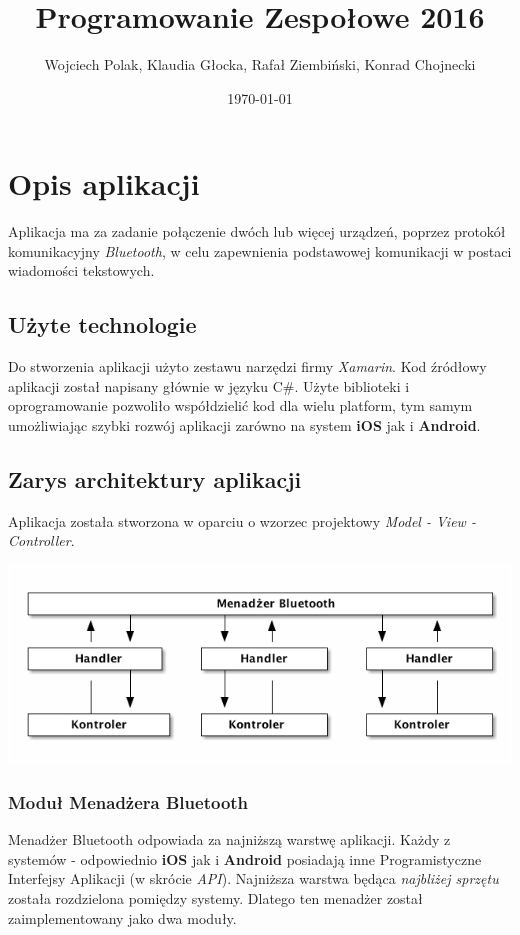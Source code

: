 \documentclass[a4paper, titlepage]{article}
\author{Wojciech Polak, Klaudia Głocka, Rafał Ziembiński, Konrad Chojnecki}
\date{\today}
\title{Programowanie Zespołowe 2016}
\begin{document}
\maketitle
\tableofcontents

\clearpage
\section{Opis aplikacji}
\label{sec-1}
Aplikacja ma za zadanie połączenie dwóch lub więcej urządzeń, poprzez protokół komunikacyjny \emph{Bluetooth}, w celu zapewnienia podstawowej komunikacji w postaci wiadomości tekstowych.
\subsection{Użyte technologie}
\label{sec-1-1}
Do stworzenia aplikacji użyto zestawu narzędzi firmy \emph{Xamarin}. Kod źródłowy aplikacji został napisany głównie w języku C\#.
Użyte biblioteki i oprogramowanie pozwoliło współdzielić kod dla wielu platform, tym samym umożliwiając szybki rozwój aplikacji zarówno na system \textbf{iOS} jak i \textbf{Android}.
\subsection{Zarys architektury aplikacji}
\label{sec-1-2}
Aplikacja została stworzona w oparciu o wzorzec projektowy \emph{Model - View - Controller}.

\includegraphics[width=.9\linewidth]{zarys.png}

\subsubsection{Moduł Menadżera Bluetooth}
\label{sec-1-2-1}
Menadżer Bluetooth odpowiada za najniższą warstwę aplikacji. Każdy z systemów - odpowiednio \textbf{iOS} jak i \textbf{Android} posiadają inne Programistyczne Interfejsy Aplikacji (w skrócie \emph{API}). Najniższa warstwa będąca \emph{najbliżej sprzętu} została rozdzielona pomiędzy systemy. Dlatego ten menadżer został zaimplementowany jako dwa moduły.
\end{document}
